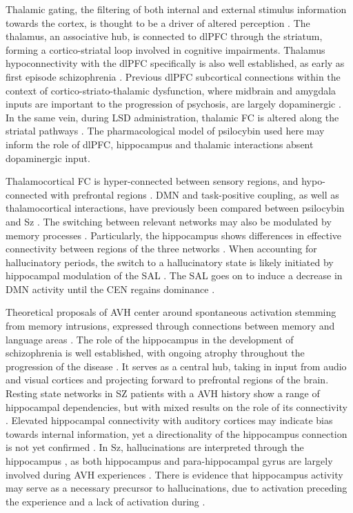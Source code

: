 \documentclass{article}
\begin{document}
Thalamic gating, the filtering of both internal and external stimulus information towards the cortex, is thought to be a driver of altered perception \citep{avram_bridging_2021}. The thalamus, an associative hub, is connected to dlPFC through the striatum, forming a cortico-striatal loop involved in cognitive impairments. Thalamus hypoconnectivity with the dlPFC specifically is also well established, as early as first episode schizophrenia \citep{zhou_functional_2007}. Previous dlPFC subcortical connections within the context of cortico-striato-thalamic dysfunction, where midbrain and amygdala inputs are important to the progression of psychosis, are largely dopaminergic \citep{sabaroedin_circuit_2023}. In the same vein, during LSD administration, thalamic FC is altered along the striatal pathways \citep{preller_effective_2019}. The pharmacological model of psilocybin used here may inform the role of dlPFC, hippocampus and thalamic interactions absent dopaminergic input. 

Thalamocortical FC is hyper-connected between sensory regions, and hypo-connected with prefrontal regions \citep{ramsay_activation_2019}. DMN and task-positive coupling, as well as thalamocortical interactions, have previously been compared between psilocybin and Sz \citep{carhart-harris_functional_2013, avram_bridging_2021}. The switching between relevant networks may also be modulated by memory processes \citep{jardri_neurodynamic_2013}. Particularly, the hippocampus shows differences in effective connectivity between regions of the three networks \citep{uscatescu_effective_2021}. When accounting for hallucinatory periods, the switch to a hallucinatory state is likely initiated by hippocampal modulation of the SAL \citep{lefebvre_network_2016}. The SAL goes on to induce a decrease in DMN activity until the CEN regains dominance \citep{lefebvre_network_2016}. 

Theoretical proposals of AVH center around spontaneous activation stemming from memory intrusions, expressed through connections between memory and language areas \citep{sommer_resting_2012}. The role of the hippocampus in the development of schizophrenia is well established, with ongoing atrophy throughout the progression of the disease \citep{duan_longitudinal_2015}. It serves as a central hub, taking in input from audio and visual cortices and projecting forward to prefrontal regions of the brain. Resting state networks in SZ patients with a AVH history show a range of hippocampal dependencies, but with mixed results on the role of its connectivity \citep{clos_aberrant_2014, diederen_deactivation_2010}. Elevated hippocampal connectivity with auditory cortices may indicate bias towards internal information, yet a directionality of the hippocampus connection is not yet confirmed \citep{alderson-day_auditory_2016}. In Sz, hallucinations are interpreted through the hippocampus \citep{jardri_cortical_2011, jardri_neurodynamic_2013}, as both hippocampus and para-hippocampal gyrus are largely involved during AVH experiences \citep{jardri_cortical_2011}. There is evidence that hippocampus activity may serve as a necessary precursor to hallucinations, due to activation preceding the experience and a lack of activation during \citep{diederen_deactivation_2010, hoffman_using_2011}. 
\end{document}
